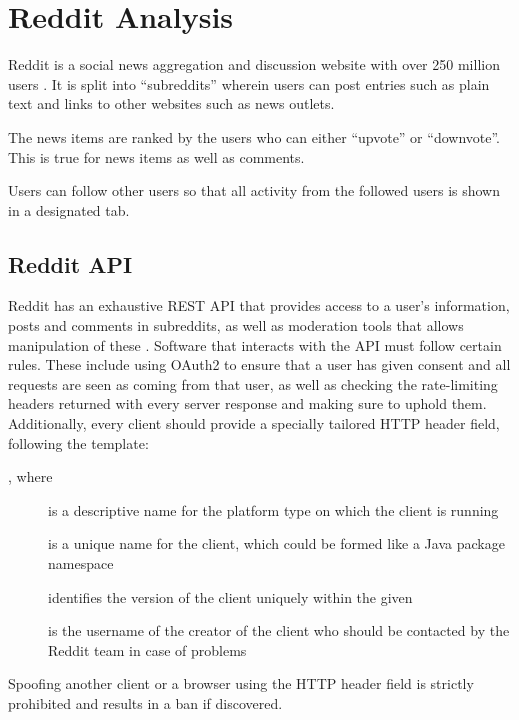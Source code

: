 \section{Reddit Analysis}\label{sec:reddit-analysis}

Reddit is a social news aggregation and discussion website with over 250 million users \citep{AdvertiseOnReddit}.
It is split into ``subreddits'' wherein users can post entries such as plain
text and links to other websites such as news outlets. \nl

The news items are ranked by the users who can either ``upvote'' or ``downvote''.
This is true for news items as well as comments. \citep{AboutReddit}\nl

Users can follow other users so that all activity from the followed users is
shown in a designated tab.

\subsection{Reddit API}\label{subsec:reddit-api}

Reddit has an exhaustive \ac{REST} \ac{API} that provides access to a user's information, posts and comments in
subreddits, as well as moderation tools that allows manipulation of these \citep{RedditApi}.
Software that interacts with the \ac{API} must follow certain rules.
These include using OAuth2 to ensure that a user has given consent and all
requests are seen as coming from that user, as well as checking the
rate-limiting headers returned with every server response and making sure to uphold them.
Additionally, every client should provide a specially tailored 
\ac{HTTP} header field, following the template: \citep{RedditApiRules}\nl

\begin{center}
  , where
\end{center}\nl

\begin{description}
  \item[] is a descriptive name for the platform type on which the client is running
  \item[] is a unique name for the client, which could be formed like a Java package namespace
  \item[] identifies the version of the client uniquely within the given 
  \item[] is the username of the creator of the client who should be contacted by the Reddit team
  in case of problems
\end{description}\nl

Spoofing another client or a browser using the  \ac{HTTP} header field is strictly prohibited and
results in a ban if discovered. \citep{RedditApiRules}\nl
